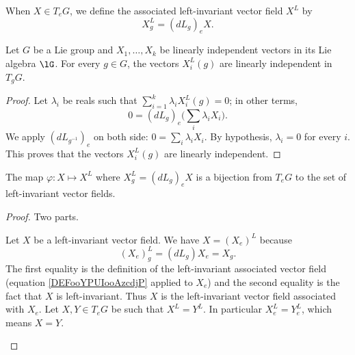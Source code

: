 When \( X\in T_eG\), we define the associated left-invariant vector field \( X^L\) by
\begin{equation}        \label{DEFooYPUIooAzcdjP}
    X^L_g=(dL_g)_eX.
\end{equation}

\begin{lemma}       \label{LEMooWTNRooCjlYMJ}
    Let \( G\) be a Lie group and \( X_1,\ldots, X_k\) be linearly independent vectors in its Lie algebra \( \lG\). For every \( g\in G\), the vectors \( X_i^L(g)\) are linearly independent in \( T_gG\).
\end{lemma}

\begin{proof}
    Let \( \lambda_i\) be reals such that \( \sum_{i=1}^k\lambda_iX_i^L(g)=0\); in other terms,
    \begin{equation}
        0=(dL_g)_e\big( \sum_i\lambda_iX_i \big).
    \end{equation}
    We apply \( (dL_{g^{-1}})_e\) on both side: \( 0=\sum_i\lambda_iX_i\). By hypothesis, \( \lambda_i=0\) for every \( i\). This proves that the vectors \( X^L_i(g)\) are linearly independent.
\end{proof}

\begin{theorem}
	The map \( \varphi\colon X\mapsto X^L\) where \( X^L_g=(dL_g)_eX\) is a bijection from \( T_eG\) to the set of left-invariant vector fields.
\end{theorem}

\begin{proof}
    Two parts.
    \begin{subproof}
        \spitem[Surjective]
            Let \( X\) be a left-invariant vector field. We have \( X=(X_e)^L\) because
            \begin{equation}
                (X_e)^L_g=(dL_g)X_e=X_g.
            \end{equation}
            The first equality is the definition of the left-invariant associated vector field (equation \eqref{DEFooYPUIooAzcdjP} applied to \( X_e\)) and the second equality is the fact that \( X\) is left-invariant. Thus \( X\) is the left-invariant vector field associated with \( X_e\).
        \spitem[Injective]
            Let \( X,Y\in T_eG\) be such that \( X^L=Y^L\). In particular \( X^L_e=Y^L_e\), which means \( X=Y\).
    \end{subproof}
\end{proof}

